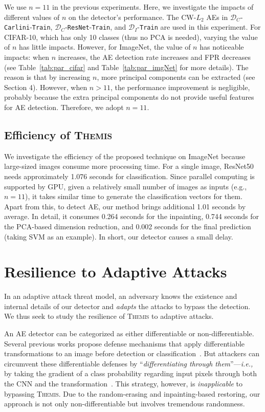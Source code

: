 \documentclass[sigconf]{acmart}
\newcommand{\oursys}{\textsc{Themis}\xspace}
\begin{document}
We use $n=11$ in the previous experiments.
Here, we investigate the
impacts of different values of $n$ on the detector's performance. 
The CW-$L_2$ AEs in   $\mathcal{D}_C$-\texttt{Carlini}-\texttt{Train}, $\mathcal{D}_C$-\texttt{ResNet}-\texttt{Train}, and $\mathcal{D}_I$-\texttt{Train} are used in this experiment. 
For CIFAR-10, which has only 10 classes (thus no PCA is needed), 
varying the value of $n$ has little impacts.
However, for ImageNet, the value of $n$ has 
noticeable impacts: when $n$ increases, the AE detection rate
increases and FPR decreases (see Table~\ref{tab:par_cifar} and Table~\ref{tab:par_imgNet} for more details). The reason is that by increasing $n$,
more principal components can be extracted (see Section 4).
However, when $n>11$, the performance improvement is negligible, probably because the extra principal components do not provide useful features for AE detection.
Therefore, we adopt $n=11$. 


\subsection{Efficiency of \oursys}
We investigate the efficiency of the proposed technique on ImageNet because large-sized images consume more processing time. For a single image, ResNet50 needs approximately 1.076 seconds for classification. Since parallel computing is supported by GPU, given a relatively small number of images as inputs (e.g., $n=11$), it takes similar time to generate the classification vectors for them. Apart from this, 
to detect AE, our method brings additional 1.01
seconds by average. In detail, it consumes 0.264 seconds for the inpainting, 0.744 seconds for the PCA-based dimension reduction, and 0.002 seconds for the final prediction (taking SVM as an example). In short,  our detector causes a small delay.



\section{Resilience to Adaptive Attacks}\label{sec:adapt}
In an adaptive attack threat model, an adversary knows the existence and internal 
details of our detector and \emph{adapts} the attacks to bypass the detection. We thus seek to 
study the resilience of \oursys to adaptive attacks. 

An AE detector can be categorized as either differentiable or non-differentiable. 
Several previous works propose defense mechanisms that apply differentiable transformations to an image before detection or classification~\cite{metzen2017detecting,gong2017adversarial,grosse2017statistical,tian2018detecting}. But attackers can circumvent 
these  differentiable defenses by ``\emph{differentiating through them}''---\emph{i.e.,} by taking the gradient
of a class probability regarding input pixels through both the CNN and the transformation~\cite{prakash2018deflecting,carlini2017adversarial,he2017adversarial}. This strategy, however, is \emph{inapplicable} to bypassing \oursys. 
Due to the random-erasing and inpainting-based restoring, our approach is not only non-differentiable but involves tremendous randomness. 
\end{document}
